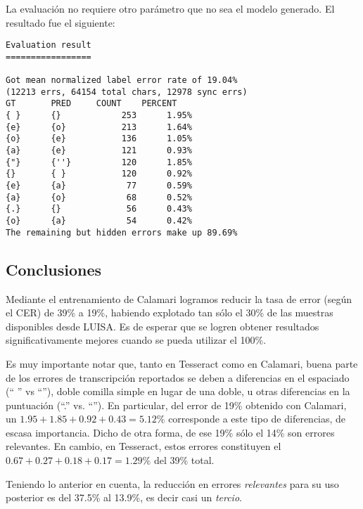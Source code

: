 \documentclass{article}
\begin{document}
La evaluación no requiere otro parámetro que no sea el modelo generado.
El resultado fue el siguiente:

\begin{verbatim}
Evaluation result
=================

Got mean normalized label error rate of 19.04% 
(12213 errs, 64154 total chars, 12978 sync errs)
GT       PRED     COUNT    PERCENT   
{ }      {}            253      1.95%
{e}      {o}           213      1.64%
{o}      {e}           136      1.05%
{a}      {e}           121      0.93%
{"}      {''}          120      1.85%
{}       { }           120      0.92%
{e}      {a}            77      0.59%
{a}      {o}            68      0.52%
{.}      {}             56      0.43%
{o}      {a}            54      0.42%
The remaining but hidden errors make up 89.69%

\end{verbatim}

\subsection{Conclusiones}

	Mediante el entrenamiento de Calamari logramos reducir la tasa de error (según el CER)
de 39\% a 19\%, habiendo explotado tan sólo el 30\% de las muestras disponibles desde LUISA.
Es de esperar que se logren obtener resultados significativamente mejores cuando se pueda
utilizar el 100\%.

Es muy importante notar que, tanto en Tesseract como en Calamari, 
buena parte de los errores de transcripción reportados se deben a
		diferencias en el espaciado (`` '' vs ``''), 
		doble comilla simple en lugar de una doble, u otras diferencias
		en la puntuación (``.'' vs. ``''). En particular, del error de 19\% obtenido
		con Calamari, un $1.95 + 1.85 + 0.92 + 0.43 = 5.12\%$ corresponde a este 
		tipo de diferencias, de escasa importancia. Dicho de otra forma,
		de ese 19\% sólo el 14\% son errores relevantes.
		En cambio, en Tesseract, estos errores constituyen el $0.67 + 0.27 + 0.18 + 0.17=1.29\%$
		del 39\% total.

Teniendo lo anterior en cuenta, la reducción en errores \emph{relevantes} para su uso posterior
es del 37.5\% al 13.9\%, es decir casi un \emph{tercio}.

\end{document}
